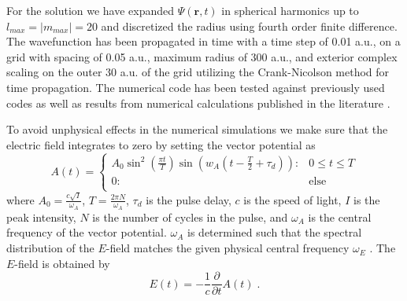 For the solution we have expanded $\Psi(\mathbf{r},t)$ in spherical harmonics up to $l_{max} = |m_{max}| = 20$ and discretized the radius using fourth order finite difference. The wavefunction has been propagated in time with a time step of 0.01 a.u., on a grid with spacing of 0.05 a.u., maximum radius of 300 a.u., and exterior complex scaling on the outer 30 a.u. of the grid utilizing the Crank-Nicolson method for time propagation. The numerical code has been tested against previously used codes as well as results from numerical calculations published in the literature \cite{scrinzi2010}.

To avoid unphysical effects in the numerical simulations we make sure that the electric field integrates to zero by setting the vector potential as \cite{chelkowski2002}
%
\begin{equation}
A(t) = \begin{cases} 
      A_0 \sin^2\left(\frac{\pi t}{T}\right)\sin(w_A(t-\frac{T}{2}+\tau_d)): & 0\leq t \leq T \\
      0: & \mbox{else} \\
   \end{cases} 
\end{equation}
%
where $A_0 = \frac{c\sqrt{I}}{\omega_A}$, $T = \frac{2\pi N}{\omega_A}$, $\tau_d$ is the pulse delay, $c$ is the speed of light, $I$ is the peak intensity, $N$ is the number of cycles in the pulse, and $\omega_A$ is the central frequency of the vector potential. $\omega_A$ is determined such that the spectral distribution of the $E$-field matches the given physical central frequency $\omega_E$ \cite{venzke2018_Central}. The $E$-field is obtained by
%
\begin{equation}
    E(t) = -\frac{1}{c}\frac{\partial}{\partial t}A(t)\; .
\end{equation}

